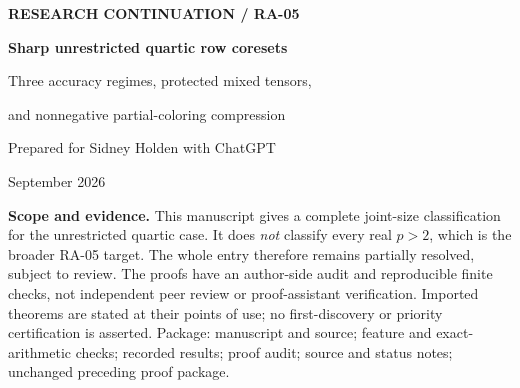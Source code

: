 \documentclass[11pt]{article}
\theoremstyle{remark}\newtheorem{remark}[theorem]{Remark}
\newcommand{\wt}{\widetilde}
\numberwithin{equation}{section}
\begin{document}
\begin{titlepage}
\vspace*{0.35in}
{\small\sffamily\bfseries RESEARCH CONTINUATION / RA-05}\par\vspace{0.2in}
{\LARGE\bfseries Sharp unrestricted quartic row coresets}\par\vspace{0.12in}
{\large Three accuracy regimes, protected mixed tensors,\par and nonnegative partial-coloring compression}\par\vspace{0.25in}
Prepared for Sidney Holden with ChatGPT\par September 2026
\vspace{0.25in}
\begin{abstract}
Let $S_4(k,\varepsilon)$ be the worst-case minimum support of a nonnegative strong coreset on original rows for quartic Euclidean subspace approximation, with query dimension at most $k$. There is no restriction on the rank of the input matrix. We prove
\[
 S_4(k,\varepsilon)=\wt\Theta\!\left(
 \min\left\{\frac{k^2}{\varepsilon^2},\,
 \frac{k^{5/2}}{\varepsilon}+\frac{k}{\varepsilon^2}\right\}\right)
\]
for every $k\ge1$ and $0<\varepsilon<1/2$. More precisely, the lower bound has an absolute constant and no logarithmic loss, while the upper bound has at most a ninth power of $\log(2k/\varepsilon)$. The new upper bound is
$O((k^{5/2}/\varepsilon+k/\varepsilon^2)\log^5(2k/\varepsilon))$.
It combines an optimal-head split, exact protection of a controlled number of mixed-tensor directions, anisotropic matrix-Gaussian estimates, and repeated partial coloring with frozen fractional exceptions. Every final weight is nonnegative and attached to an original row.

The lower bound is reproved, including both variable-density hyperplane examples and arbitrary-rank orthogonal blocks. Thus the earlier rank restriction is removed at $p=4$: in particular, accuracy $\varepsilon=k^{-2}$ has optimal size $\wt\Theta(k^5)$ rather than the previously surviving interval from $k^5$ to $k^6$.
\end{abstract}
\vspace{0.12in}
\textbf{Scope and evidence.} This manuscript gives a complete joint-size classification for the unrestricted quartic case. It does \emph{not} classify every real $p>2$, which is the broader RA-05 target. The whole entry therefore remains partially resolved, subject to review. The proofs have an author-side audit and reproducible finite checks, not independent peer review or proof-assistant verification. Imported theorems are stated at their points of use; no first-discovery or priority certification is asserted.
\vfill
{\small Package: manuscript and source; feature and exact-arithmetic checks; recorded results; proof audit; source and status notes; unchanged preceding proof package.}
\end{titlepage}
{\small\setlength{\parskip}{0pt}\tableofcontents}
\newpage
\end{document}
